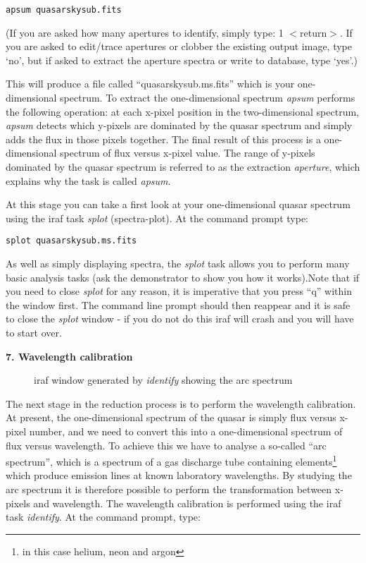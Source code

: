 {\tt apsum quasarskysub.fits}

(If you are asked how many apertures to identify, simply type: 1 $<$return$>$.  If you are asked to edit/trace apertures or clobber
the existing output image, type `no', but if asked to extract the aperture spectra or write to database, type `yes'.)

This will produce a file called ``quasarskysub.ms.fits'' which is your
one-dimensional spectrum. To extract the one-dimensional spectrum
{\it apsum} performs the following operation: at each x-pixel
position in the two-dimensional spectrum, {\it apsum} detects which y-pixels
are dominated by the quasar spectrum and simply adds the flux in those pixels
together. The final result of this process is a one-dimensional
spectrum of flux versus x-pixel value. The range of y-pixels dominated
by the quasar spectrum is referred to as the extraction {\it
aperture}, which explains why the task is called {\it apsum}.

At this stage you can take a first look at your one-dimensional quasar
spectrum using the {\sc iraf} task {\it splot} (spectra-plot). At the
command prompt type:

{\tt splot quasarskysub.ms.fits}

\newpage

As well as simply displaying spectra, the {\it splot} task allows you
to perform many basic analysis tasks (ask the demonstrator to show you
how it works).Note that if you need to close {\it splot} for any reason,
it is imperative that you press ``q'' within the window first. The command
line prompt should then reappear and it is safe to close the {\it splot} window - 
if you do not do this {\sc iraf} will crash and you will have to start over.



{\large {\bf 7. Wavelength calibration}}
\begin{figure}
\centerline{}
\caption{{\sc iraf} window generated by {\it identify} showing the
arc spectrum}
\end{figure}

The next stage in the reduction process is to perform the wavelength
calibration. At present, the one-dimensional spectrum of the quasar is
simply flux versus x-pixel number, and we need to
convert this into a one-dimensional spectrum of flux versus
wavelength. To achieve this we have to analyse a so-called ``arc
spectrum'', which is a spectrum of a gas discharge tube containing
elements\footnote{in this case helium, neon and argon} which produce emission lines at known laboratory
wavelengths. By studying the arc spectrum it is therefore possible to
perform the transformation between x-pixels and wavelength. The
wavelength calibration is performed using the {\sc iraf} task {\it
identify}. At the command prompt, type:

